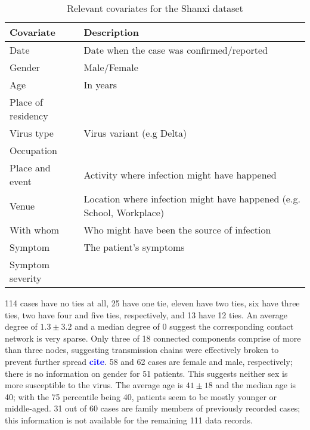 \documentclass{article}
\newcommand{\add}[1]{\textbf{\textcolor{blue}{#1}}}
\begin{document}
\begin{table}
		\begin{tabularx}{\linewidth}{L{.4\linewidth}L{.6\linewidth}}
			\hline
			\textbf{Covariate} & \textbf{Description}\\
			\hline
			Date & Date when the case was confirmed/reported\\
			Gender & Male/Female\\
			Age & In years\\
			Place of residency & \\
			Virus type & Virus variant (e.g Delta)\\
			Occupation & \\
			Place and event & Activity where infection might have happened\\
			Venue & Location where infection might have happened (e.g. School, Workplace)\\
			With whom & Who might have been the source of infection\\
			Symptom & The patient's symptoms\\
			Symptom severity & \\
			\hline
		\end{tabularx}
		\caption{Relevant covariates for the Shanxi dataset}
		\label{tab:china_covariates}
	\end{table}
	114 cases have no ties at all, 25 have one tie, eleven have two ties, six have three ties, two have four and five ties, respectively, and 13 have 12 ties. An average degree of $1.3\pm3.2$ and a median degree of 0 suggest the corresponding contact network is very sparse. Only three of 18 connected components comprise of more than three nodes, suggesting transmission chains were effectively broken to prevent further spread \add{cite}. 58 and 62 cases are female and male, respectively; there is no information on gender for 51 patients. This suggests neither sex is more susceptible to the virus. The average age is $41\pm18$ and the median age is 40; with the 75 percentile being 40, patients seem to be mostly younger or middle-aged. 31 out of 60 cases are family members of previously recorded cases; this information is not available for the remaining 111 data records.
	
\end{document}

